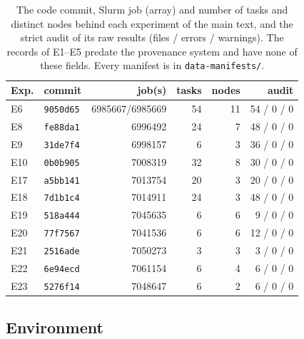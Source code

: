 \documentclass[preprint,12pt]{elsarticle}
\begin{document}
\begin{table}[t]
  \caption{The code commit, Slurm job (array) and number of tasks and distinct nodes behind each experiment of the main text, and the strict
  audit of its raw results (files / errors / warnings). The records of E1--E5 predate the provenance system and have none of these fields.
  Every manifest is in \texttt{data-manifests/}.}
  \label{tab:commits}
  \small
  \begin{tabular}{@{}llrrrr@{}}
    \toprule
    Exp. & commit & job(s) & tasks & nodes & audit \\
    \midrule
    E6 & \texttt{9050d65} & 6985667/6985669 & 54 & 11 & 54 / 0 / 0 \\
    E8 & \texttt{fe88da1} & 6996492 & 24 & 7 & 48 / 0 / 0 \\
    E9 & \texttt{31de7f4} & 6998157 & 6 & 3 & 36 / 0 / 0 \\
    E10 & \texttt{0b0b905} & 7008319 & 32 & 8 & 30 / 0 / 0 \\
    E17 & \texttt{a5bb141} & 7013754 & 20 & 3 & 20 / 0 / 0 \\
    E18 & \texttt{7d1b1c4} & 7014911 & 24 & 3 & 48 / 0 / 0 \\
    E19 & \texttt{518a444} & 7045635 & 6 & 6 & 9 / 0 / 0 \\
    E20 & \texttt{77f7567} & 7041536 & 6 & 6 & 12 / 0 / 0 \\
    E21 & \texttt{2516ade} & 7050273 & 3 & 3 & 3 / 0 / 0 \\
    E22 & \texttt{6e94ecd} & 7061154 & 6 & 4 & 6 / 0 / 0 \\
    E23 & \texttt{5276f14} & 7048647 & 6 & 2 & 6 / 0 / 0 \\
    \bottomrule
  \end{tabular}
\end{table}

\subsection{Environment}
\label{sec:env}
\end{document}
